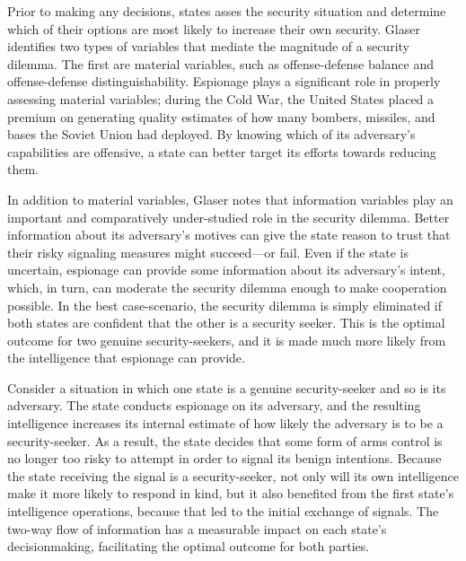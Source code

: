 \documentclass[14pt]{extarticle}
\begin{document}
Prior to making any decisions, states asses the security situation and determine which of their options are most likely to increase their own security. Glaser identifies two types of variables that mediate the magnitude of a security dilemma. The first are material variables, such as offense-defense balance and offense-defense distinguishability. Espionage plays a significant role in properly assessing material variables; during the Cold War, the United States placed a premium on generating quality estimates of how many bombers, missiles, and bases the Soviet Union had deployed. By knowing which of its adversary's capabilities are offensive, a state can better target its efforts towards reducing them.

In addition to material variables, Glaser notes that information variables play an important and comparatively under-studied role in the security dilemma. Better information about its adversary's motives can give the state reason to trust that their risky signaling measures might succeed---or fail. Even if the state is uncertain, espionage can provide some information about its adversary's intent, which, in turn, can moderate the security dilemma enough to make cooperation possible. In the best case-scenario, the security dilemma is simply eliminated if both states are confident that the other is a security seeker. This is the optimal outcome for two genuine security-seekers, and it is made much more likely from the intelligence that espionage can provide.

Consider a situation in which one state is a genuine security-seeker and so is its adversary. The state conducts espionage on its adversary, and the resulting intelligence increases its internal estimate of how likely the adversary is to be a security-seeker. As a result, the state decides that some form of arms control is no longer too risky to attempt in order to signal its benign intentions. Because the state receiving the signal is a security-seeker, not only will its own intelligence make it more likely to respond in kind, but it also benefited from the first state's intelligence operations, because that led to the initial exchange of signals. The two-way flow of information has a measurable impact on each state's decisionmaking, facilitating the optimal outcome for both parties.
\end{document}
